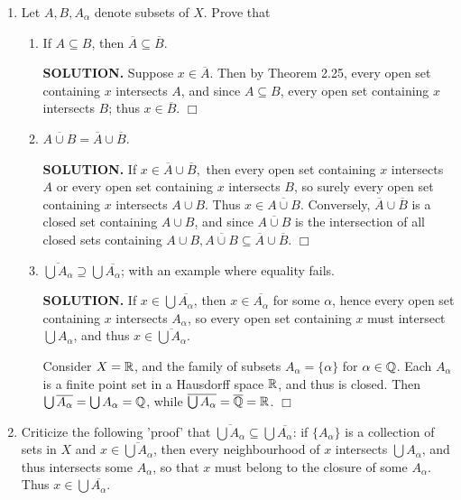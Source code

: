 \documentclass{article}
\begin{document}
\begin{enumerate}
    \item Let $A, B, A_\alpha$ denote subsets of $X$. Prove that
    \begin{enumerate}
        \item If $A \subseteq B$, then $\overline{A} \subseteq \overline{B}$.

        {\bf SOLUTION.} Suppose $x \in \overline{A}$. Then by Theorem 2.25, every open set containing $x$ intersects $A$, and since $A \subseteq B$, every open set containing $x$ intersects $B$; thus $x \in \overline{B}$. $\Box$
        
        \item $\overline{A \cup B} = \overline{A} \cup \overline{B}$.

        {\bf SOLUTION.} If $x \in \overline{A} \cup \overline{B},$ then every open set containing $x$ intersects $A$ or every open set containing $x$ intersects $B$, so surely every open set containing $x$ intersects $A \cup B$. Thus $x \in \overline{A \cup B}$. Conversely, $\overline{A} \cup \overline{B}$ is a closed set containing $A \cup B$, and since $\overline{A \cup B}$ is the intersection of all closed sets containing $A \cup B, \overline{A \cup B} \subseteq \overline{A} \cup \overline{B}$. $\Box$
        
        \item $\overline{\bigcup A_\alpha} \supseteq \bigcup \overline{A_\alpha}$; with an example where equality fails.

        {\bf SOLUTION.} If $x \in \bigcup \overline{A_\alpha}$, then $x \in \overline{A_\alpha}$ for some $\alpha$, hence every open set containing $x$ intersects $A_\alpha$, so every open set containing $x$ must intersect $\bigcup A_\alpha$, and thus $x \in \overline{\bigcup A_\alpha}$.

        Consider $X = \mathbb{R}$, and the family of subsets $A_\alpha = \{\alpha\}$ for $\alpha \in \mathbb{Q}$. Each $A_\alpha$ is a finite point set in a Hausdorff space $\mathbb{R}$, and thus is closed. Then $\bigcup \overline{A_\alpha} = \bigcup A_\alpha = \mathbb{Q}$, while $\overline{\bigcup A_\alpha} = \overline{\mathbb{Q}} = \mathbb{R}$. $\Box$
    \end{enumerate}

    \item Criticize the following 'proof' that $\overline{\bigcup A_\alpha} \subseteq \bigcup \overline{A_\alpha}$: if $\{A_\alpha\}$ is a collection of sets in $X$ and $x \in \overline{\bigcup A_\alpha}$, then every neighbourhood of $x$ intersects $\bigcup A_\alpha$, and thus intersects some $A_\alpha$, so that $x$ must belong to the closure of some $A_\alpha$. Thus $x \in \bigcup \overline{A_\alpha}$.


\end{enumerate}
\end{document}
